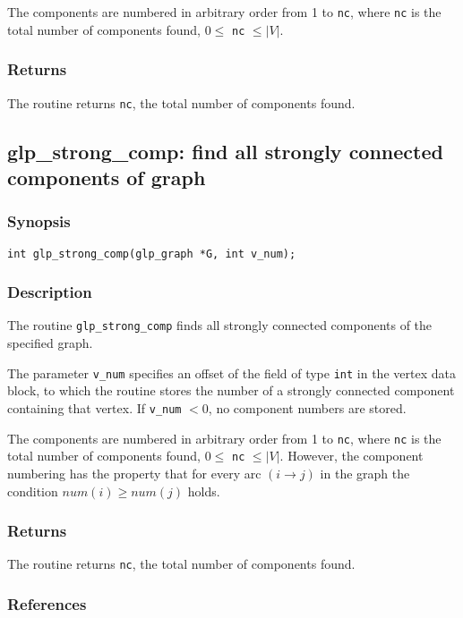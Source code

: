 The components are numbered in arbitrary order from 1 to \verb|nc|,
where \verb|nc| is the total number of components found,
$0\leq$ \verb|nc| $\leq|V|$.

\subsubsection*{Returns}

The routine returns \verb|nc|, the total number of components found.

\subsection{glp\_strong\_comp: find all strongly connected components
of graph}

\subsubsection*{Synopsis}

\begin{verbatim}
int glp_strong_comp(glp_graph *G, int v_num);
\end{verbatim}

\subsubsection*{Description}

The routine \verb|glp_strong_comp| finds all strongly connected
components of the specified graph.

The parameter \verb|v_num| specifies an offset of the field of type
\verb|int| in the vertex data block, to which the routine stores the
number of a strongly connected component containing that vertex. If
\verb|v_num| $<0$, no component numbers are stored.

The components are numbered in arbitrary order from 1 to \verb|nc|,
where \verb|nc| is the total number of components found,
$0\leq$ \verb|nc| $\leq|V|$. However, the component numbering has the
property that for every arc $(i\rightarrow j)$ in the graph the
condition $num(i)\geq num(j)$ holds.

\subsubsection*{Returns}

The routine returns \verb|nc|, the total number of components found.

\subsubsection*{References}

